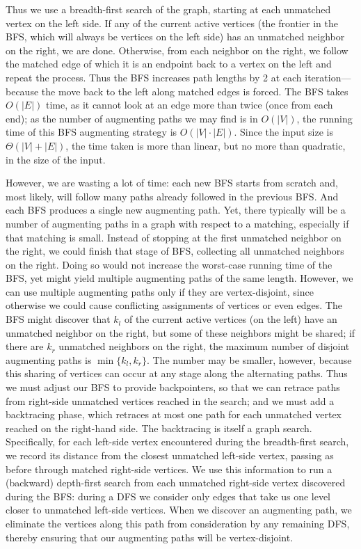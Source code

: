 \documentclass[11pt]{article}
\begin{document}
Thus we use a breadth-first search of the graph, starting at each unmatched
vertex on the left side.  If any of the current active vertices (the frontier
in the BFS, which will always be vertices on the left side) has an unmatched
neighbor on the right, we are done.  Otherwise, from each neighbor on the right,
we follow the matched edge of which it is an endpoint back to a vertex on the
left and repeat the process.
Thus the BFS increases path lengths by 2 at each iteration---because
the move back to the left along matched edges is forced.
The BFS takes $O(|E|)$ time, as it cannot look at an edge more than twice
(once from each end); as the number of augmenting paths we may find is in
$O(|V|)$, the running time of this BFS augmenting strategy is $O(|V|\cdot|E|)$.
Since the input size is $\Theta(|V|+|E|)$, the time taken is more than linear,
but no more than quadratic, in the size of the input.

However, we are wasting a lot of time: each new BFS starts from scratch and,
most likely, will follow many paths already followed in the previous BFS.
And each BFS produces a single new augmenting path.  Yet, there typically
will be a number of augmenting paths in a graph with respect to a matching,
especially if that matching is small.  Instead of stopping at the first
unmatched neighbor on the right, we could finish that stage of BFS, collecting
all unmatched neighbors on the right.  Doing so would not increase the
worst-case running time of the BFS, yet might yield multiple augmenting paths
of the same length.  However, we can use multiple augmenting paths only if
they are vertex-disjoint, since otherwise we could cause conflicting
assignments of vertices or even edges.  The BFS might discover that $k_l$
of the current active vertices (on the left) have an unmatched neighbor on
the right, but some of these neighbors might be shared; if there are $k_r$
unmatched neighbors on the right, the maximum number of disjoint augmenting
paths is $\min\{k_l,k_r\}$.  The number may be smaller, however, because
this sharing of vertices can occur at any stage along the alternating paths.
Thus we must adjust our BFS to provide backpointers, so that we can retrace
paths from right-side unmatched vertices reached in the search; and we must
add a backtracing phase, which retraces at most one path for each unmatched
vertex reached on the right-hand side.  The backtracing is itself a graph
search.  Specifically, for each left-side vertex encountered during the
breadth-first search, we record its distance from the closest unmatched
left-side vertex, passing as before through matched right-side vertices.  We
use this information to run a (backward) depth-first search from each unmatched
right-side vertex discovered during the BFS: during a DFS we consider only
edges that take us one level closer to unmatched left-side vertices.  When we
discover an augmenting path, we eliminate the vertices along this path from
consideration by any remaining DFS, thereby ensuring that our augmenting paths
will be vertex-disjoint.
\end{document}
